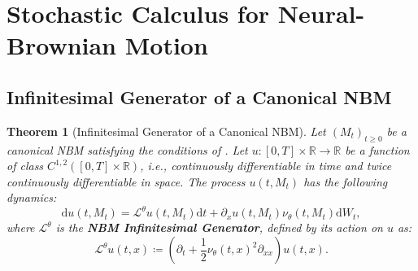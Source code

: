 \documentclass[qian]{imsart}
\newcommand{\R}{\mathbb{R}}
\newcommand{\dd}{\mathrm{d}}
\newcommand{\Lcaltheta}{\mathcal{L}^{\theta}}
\theoremstyle{plain}
\newtheorem{theorem}{Theorem}[section]
\theoremstyle{definition}
\begin{document}
\section{Stochastic Calculus for Neural-Brownian Motion}

\subsection{Infinitesimal Generator of a Canonical NBM}

\begin{theorem}[Infinitesimal Generator of a Canonical NBM]
\label{thm:nbm_generator}
Let $(M_t)_{t \ge 0}$ be a canonical NBM satisfying the conditions of . Let $u: [0,T] \times \R \to \R$ be a function of class $C^{1,2}([0,T] \times \R)$, i.e., continuously differentiable in time and twice continuously differentiable in space. The process $u(t, M_t)$ has the following dynamics:
\[ \dd u(t, M_t) = \Lcaltheta u(t, M_t) \dd t + \partial_x u(t, M_t) \nu_\theta(t, M_t) \dd W_t, \]
where $\Lcaltheta$ is the \textbf{NBM Infinitesimal Generator}, defined by its action on $u$ as:
\begin{equation}
\label{eq:neural_generator}
    \Lcaltheta u(t,x) \coloneqq \left( \partial_t + \frac{1}{2} \nu_\theta(t,x)^2 \partial_{xx} \right) u(t,x).
\end{equation}
\end{theorem}
\end{document}
